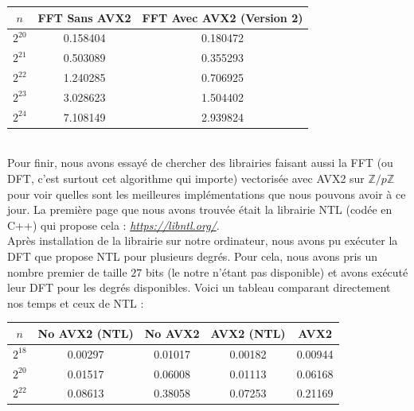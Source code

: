 \documentclass[12pt, a4paper]{article}
\begin{document}
\begin{center}
\begin{tabular}{||c c c||}
\hline
$n$ & FFT Sans AVX2 & FFT Avec AVX2 (Version 2) \\
\hline\hline
$2^{20}$ & 0.158404 & 0.180472\protect\footnotemark \\
\hline
$2^{21}$ & 0.503089 & 0.355293 \\
\hline
$2^{22}$ & 1.240285 & 0.706925 \\
\hline
$2^{23}$ & 3.028623 & 1.504402 \\
\hline
$2^{24}$ & 7.108149 & 2.939824 \\
\hline
\end{tabular}
\end{center}
{}
\ \\
\indent Pour finir, nous avons essayé de chercher des librairies faisant aussi la FFT (ou DFT, c'est surtout cet algorithme qui importe) vectorisée avec AVX2 sur $\mathbb{Z}/p\mathbb{Z}$ pour voir quelles sont les meilleures implémentations que nous pouvons avoir à ce jour. La première page que nous avons trouvée était la librairie NTL (codée en C++) qui propose cela : \href{https://libntl.org/}{\textit{\color{blue}https://libntl.org/}}.\\
\indent Après installation de la librairie sur notre ordinateur, nous avons pu exécuter la DFT que propose NTL pour plusieurs degrés. Pour cela, nous avons pris un nombre premier de taille $27$ bits (le notre n'étant pas disponible) et avons exécuté leur DFT pour les degrés disponibles. Voici un tableau comparant directement nos temps et ceux de NTL :
\begin{center}
\begin{tabular}{||c c c c c||}
\hline
$n$ & No AVX2 (NTL) & No AVX2 & AVX2 (NTL) & AVX2\footnotemark \\
\hline\hline
$2^{18}$ & 0.00297 & 0.01017 & 0.00182 & 0.00944 \\
\hline
$2^{20}$ & 0.01517 & 0.06008 & 0.01113 & 0.06168 \\
\hline
$2^{22}$ & 0.08613 & 0.38058 & 0.07253 & 0.21169 \\
\hline
\end{tabular}
\end{center}
{}
\end{document}
